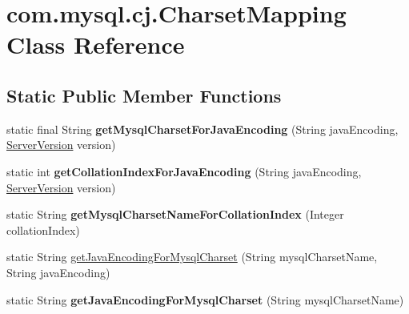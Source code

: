 \hypertarget{classcom_1_1mysql_1_1cj_1_1_charset_mapping}{}\section{com.\+mysql.\+cj.\+Charset\+Mapping Class Reference}
\label{classcom_1_1mysql_1_1cj_1_1_charset_mapping}
\subsection*{Static Public Member Functions}
\begin{DoxyCompactItemize}
\item 
\mbox{\label{classcom_1_1mysql_1_1cj_1_1_charset_mapping_a45a0491159f7d586e8b73253f8a7d66f}} 
static final String {\bfseries get\+Mysql\+Charset\+For\+Java\+Encoding} (String java\+Encoding, \mbox{\hyperlink{classcom_1_1mysql_1_1cj_1_1_server_version}{Server\+Version}} version)
\item 
\mbox{\label{classcom_1_1mysql_1_1cj_1_1_charset_mapping_a1a1f492ed1ad7d1bf4209508f4b9df69}} 
static int {\bfseries get\+Collation\+Index\+For\+Java\+Encoding} (String java\+Encoding, \mbox{\hyperlink{classcom_1_1mysql_1_1cj_1_1_server_version}{Server\+Version}} version)
\item 
\mbox{\label{classcom_1_1mysql_1_1cj_1_1_charset_mapping_abf5e68749ab0b4a9c5ee8259435ac614}} 
static String {\bfseries get\+Mysql\+Charset\+Name\+For\+Collation\+Index} (Integer collation\+Index)
\item 
static String \mbox{\hyperlink{classcom_1_1mysql_1_1cj_1_1_charset_mapping_adcf497aaea2895c19f34687c266346e8}{get\+Java\+Encoding\+For\+Mysql\+Charset}} (String mysql\+Charset\+Name, String java\+Encoding)
\item 
\mbox{\label{classcom_1_1mysql_1_1cj_1_1_charset_mapping_a9c7e097901eb66aa023c4c0cf7638fca}} 
static String {\bfseries get\+Java\+Encoding\+For\+Mysql\+Charset} (String mysql\+Charset\+Name)
\item 
\mbox{\label{classcom_1_1mysql_1_1cj_1_1_charset_mapping_a147550cb73d4a301fb41352263ccc6a2}} 

\end{DoxyCompactItemize}
